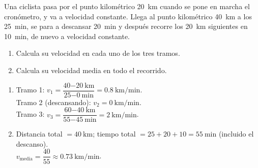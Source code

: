 \begin{exercise}
    Una ciclista pasa por el punto kilométrico \qty{20}{\km} cuando se pone en marcha el cronómetro, y va a velocidad constante. Llega al punto kilométrico \qty{40}{\km} a los \qty{25}{\minute}, se para a descansar \qty{20}{\minute} y después recorre los \qty{20}{\km} siguientes en \qty{10}{\minute}, de nuevo a velocidad constante.
    \begin{enumerate}[label=\letraminuscula]
        \item Calcula su velocidad en cada uno de los tres tramos.
        \item Calcula su velocidad media en todo el recorrido.
    \end{enumerate}
    \begin{solu}
        \begin{enumerate}[label=\alph*)]
            \item Tramo 1: \(v_1 = \dfrac{40\qty{-20}{\km}}{25\qty{-0}{\minute}} = \qty{0.8}{\km\per\minute}\). \\
            Tramo 2 (descansando): \(v_2 = \qty{0}{\km\per\minute}\). \\
            Tramo 3: \(v_3 = \dfrac{60\qty{-40}{\km}}{55\qty{-45}{\minute}} = \qty{2}{\km\per\minute}\).
            \item Distancia total \(= \qty{40}{\km}\); tiempo total \(= 25 + 20 + 10 = \qty{55}{\minute}\) (incluido el descanso). \\
            \(v_{\text{media}} = \dfrac{40}{55} \approx \qty{0.73}{\km\per\minute}\).
        \end{enumerate}
    \end{solu}
\end{exercise}

